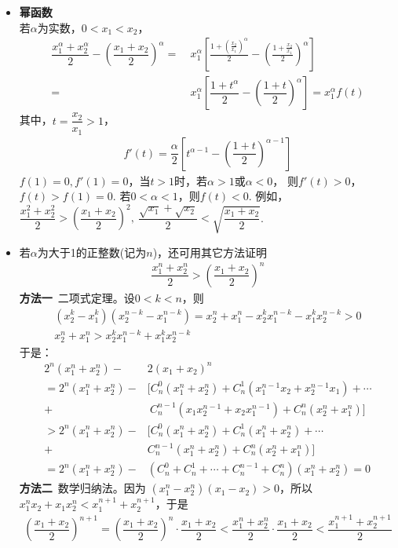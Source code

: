 \begin{itemize}[leftmargin=\inteval{\myitemleftmargin}pt,itemsep=
   \inteval{\myitemitempsep}pt,topsep=\inteval{\myitemtopsep}pt]
\item \textbf{幂函数} \\
若$ \alpha $为实数，$ 0<x_1<x_2 $，
\begin{align*}
    \dfrac{x_1^{\alpha}+x_2^{\alpha}}{2}-\left( \dfrac{x_1+x_2}{2}\right)^{\alpha} =&\ 
    x_1^{\alpha}\left[\frac{1+\left( \frac{x_2}{x_1}\right)^{\alpha} }{2}-
    \left(\frac{1+\frac{x_2}{x_1}}{2} \right)^{\alpha} \right]   \\
    =&\  x_1^{\alpha}\left[ \dfrac{1+t^{\alpha}}{2}-\left(\dfrac{1+t}{2} 
    \right)^{\alpha}  \right]  =x_1^{\alpha}f(t)
\end{align*}
其中，$ t=\dfrac{x_2}{x_1}>1 $，
\begin{align*}
    f'(t)=\dfrac{\alpha}{2}\left[ t^{\alpha-1}-
    \left( \dfrac{1+t}{2}\right)^{\alpha-1}\right]
\end{align*}
$ f(1)=0,f'(1)=0 $，当$ t>1 $时，若$ \alpha>1 $或$ \alpha<0 $，
则$ f'(t)>0 $，$ f(t)>f(1)=0 $. 
若$ 0<\alpha<1 $，则$ f(t)<0 $. 
例如，$ \dfrac{x_1^2+x_2^2}{2}>\left(\dfrac{x_1+x_2}{2}\right)^2,\  \dfrac{\sqrt{x_1}+\sqrt{x_2}}{2}<\sqrt{\dfrac{x_1+x_2}{2}} $.  

\item 若$ \alpha $为大于1的正整数(记为$ n $)，还可用其它方法证明
\begin{gather}\label{幂函数凹凸性不等式}
    \dfrac{x_1^n+x_2^n}{2}>\left( \dfrac{x_1+x_2}{2}\right)^n
\end{gather}
\textbf{方法一}\ 二项式定理。设$ 0<k<n $，则
\begin{gather*}
    (x_2^k-x_1^k)(x_2^{n-k}-x_1^{n-k})=
     x_2^n+x_1^n-x_2^kx_1^{n-k}-x_1^kx_2^{n-k}>0 \\
     x_2^n+x_1^n > x_2^kx_1^{n-k}+x_1^kx_2^{n-k}
\end{gather*}
于是：
\begin{align*}
    2^n(x_1^n+x_2^n)-& 2(x_1+x_2)^n \\
    =2^n(x_1^n+x_2^n)-&\bigl[C_n^0(x_1^n+x_2^n)+C_n^1(x_1^{n-1}x_2+x_2^{n-1}x_1)+\cdots\\
    + &\ C_n^{n-1}(x_1x_2^{n-1}+x_2x_1^{n-1})+C_n^n(x_2^n+x_1^n) \bigr] \\
    >2^n(x_1^n+x_2^n)-&\bigl[C_n^0(x_1^n+x_2^n)+C_n^1(x_1^n+x_2^n)
    +\cdots \\+ &C_n^{n-1}(x_1^n+x_2^n)+C_n^n(x_2^n+x_1^n) \bigr] \\
    =2^n(x_1^n+x_2^n)-&(C_n^0+C_n^1+\cdots +C_n^{n-1}+C_n^n)(x_1^n+x_2^n) = 0
\end{align*}
\textbf{方法二}\ 数学归纳法。因为 $ (x_1^n-x_2^n)(x_1-x_2)>0 $，所以
$ x_1^nx_2+x_1x_2^n<x_1^{n+1}+x_2^{n+1} $，于是
\begin{align*}
    \left(\dfrac{x_1+x_2}{2} \right)^{n+1} =
    \left(\dfrac{x_1+x_2}{2} \right)^{n}\cdot \dfrac{x_1+x_2}{2}
    <\dfrac{x_1^n+x_2^n}{2}\cdot
    \dfrac{x_1+x_2}{2} <\dfrac{x_1^{n+1}+x_2^{n+1}}{2} 
\end{align*}


\end{itemize}


